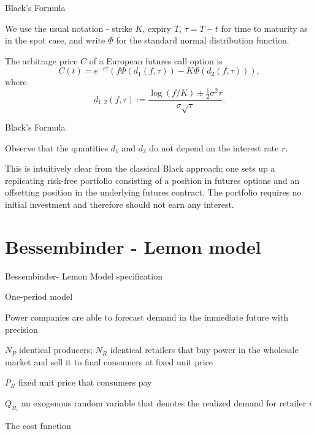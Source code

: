 
{Black's Formula}


	We use the usual notation -
strike $K$, expiry $T$, $\tau=T-t$ for time to maturity as in the spot case, and write $\Phi$ for the
standard normal distribution function.

	The arbitrage price $C$ of a European futures call option is
\begin{equation}\label{Black}
C(t)= e^{-r\tau} (f \Phi(d_1 (f,\tau)) - K \Phi(d_2 (f,\tau))),
\end{equation}
where
$$
d_{1,2} (f,\tau) := \frac{\log (f/K) \pm \frac{1}{2} {\sigma}^2 \tau}{
\sigma \sqrt{\tau}}.
$$


{Black's Formula}


	Observe that the quantities $d_1$ and $d_2$ do not depend on the
interest rate $r$.

	This is intuitively clear from the classical
Black approach: one sets up a replicating risk-free portfolio
consisting of a position in futures options and an offsetting
position in the underlying futures contract. The portfolio
requires no initial investment and therefore should not earn any
interest.


\section{Bessembinder - Lemon model}

{Bessembinder- Lemon Model specification}


	One-period model

	Power companies are able to forecast demand in the immediate future with precision

	$N_P$ identical producers; $N_R$ identical retailers that buy power in the wholesale market and sell it to final consumers at fixed unit price

	$P_R$ fixed unit price that consumers pay

	$Q_{R_i}$ an exogenous random variable that denotes the realized demand for retailer $i$


{The cost function}

